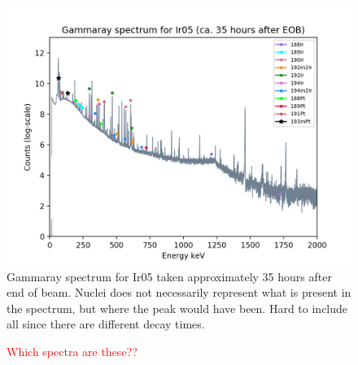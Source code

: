 \documentclass[a4paper,11pt,twoside]{book}
\begin{document}
\begin{figure}
    \centering
    \includegraphics{Analysis/gammaray_spec_Ir05.png}
    \caption{Gammaray spectrum for Ir05 taken approximately 35 hours after end of beam. Nuclei does not necessarily represent what is present in the spectrum, but where the peak would have been. Hard to include all since there are different decay times. }
    \label{fig:gammarayspectrum_example}
\end{figure}


\begin{figure}%
    \centering
    \quad
    \caption{\textcolor{red}{Which spectra are these??  }}%
    \label{fig:193mPt_spectra}%
\end{figure}
\end{document}
